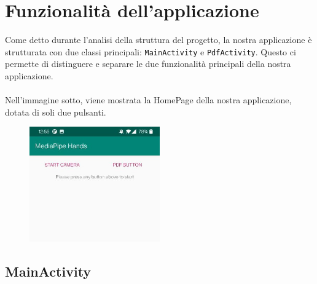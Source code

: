 \chapter{Funzionalità dell'applicazione}

Come detto durante l'analisi della struttura del progetto, la nostra applicazione è strutturata 
    con due classi principali: \texttt{MainActivity} e \texttt{PdfActivity}. 
    Questo ci permette di distinguere e separare le due funzionalità principali della nostra applicazione.\\
    \\
    \noindent Nell'immagine sotto, viene mostrata la HomePage della nostra applicazione, dotata di soli due pulsanti.

\begin{figure}[H]
    \centering
    \includegraphics[width=0.5\textwidth]{images/homepage.png}
\end{figure}



\newpage
\section{MainActivity}

